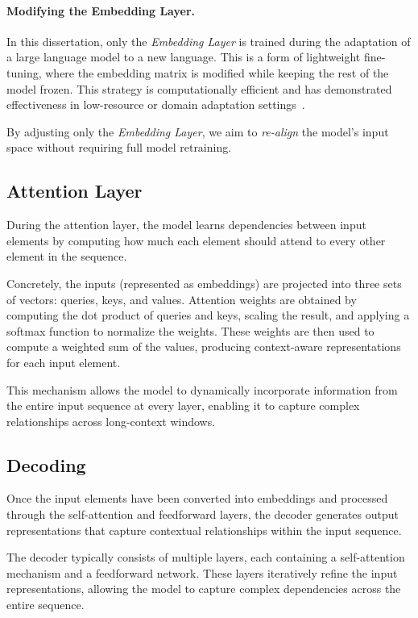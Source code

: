 \paragraph{Modifying the Embedding Layer.} In this dissertation, only the \emph{Embedding Layer} is trained during the adaptation of a large language model to a new language. This is a form of lightweight fine-tuning, where the embedding matrix is modified while keeping the rest of the model frozen. This strategy is computationally efficient and has demonstrated effectiveness in low-resource or domain adaptation settings~\cite{artetxe2019cross}.

By adjusting only the \emph{Embedding Layer}, we aim to \textit{re-align} the model's input space without requiring full model retraining.


\subsection{Attention Layer}\label{Section2.2.3}\label{subsec:attention-layer}
During the attention layer, the model learns dependencies between input elements by computing how much each element should attend to every other element in the sequence. 

Concretely, the inputs (represented as embeddings) are projected into three sets of vectors: queries, keys, and values. Attention weights are obtained by computing the dot product of queries and keys, scaling the result, and applying a softmax function to normalize the weights. These weights are then used to compute a weighted sum of the values, producing context-aware representations for each input element.

This mechanism allows the model to dynamically incorporate information from the entire input sequence at every layer, enabling it to capture complex relationships across long-context windows.


\subsection{Decoding}\label{Section2.2.2}
Once the input elements have been converted into embeddings and processed through the self-attention and feedforward layers, the decoder generates output representations that capture contextual relationships within the input sequence.  

The decoder typically consists of multiple layers, each containing a self-attention mechanism and a feedforward network. These layers iteratively refine the input representations, allowing the model to capture complex dependencies across the entire sequence.

